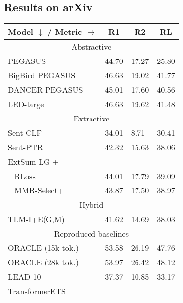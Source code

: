 \documentclass[11pt]{article}
\begin{document}
\subsection{Results on arXiv}
\label{subsec:Results on arXiv}

\begin{table}[ht]
\fontsize{9}{9}
\selectfont
\centering
\begin{tabular}[t]{@{}llll@{}}
\toprule
Model $\downarrow$ / Metric $\rightarrow$ & \multicolumn{1}{c}{R1} & \multicolumn{1}{c}{R2} & \multicolumn{1}{c}{RL} \\ \midrule
\multicolumn{4}{c}{Abstractive }               \\ \midrule
PEGASUS \citeyearpar{zhang2019pegasus}                & 44.70  & 17.27 & 25.80  \\
BigBird PEGASUS \citeyearpar{bigbird}        & \underline{46.63} & 19.02 & \underline{41.77} \\
DANCER  PEGASUS \citeyearpar{dancer2020}       & 45.01 & 17.60  & 40.56 \\
LED-large \citeyearpar{longformer}    & \underline{46.63} & \underline{19.62} & 41.48 \\ \midrule
\multicolumn{4}{c}{Extractive }                \\ \midrule
Sent-CLF \citeyearpar{pilault-etal-2020-extractive}              & 34.01 & 8.71  & 30.41 \\
Sent-PTR \citeyearpar{pilault-etal-2020-extractive}              & 42.32 & 15.63 & 38.06 \\
ExtSum-LG + \citeyearpar{xiao-carenini-2020-systematically}  &&&\\
~ RLoss & \underline{44.01} & \underline{17.79} & \underline{39.09} \\
~ MMR-Select+  & 43.87 & 17.50  & 38.97 \\ \midrule
\multicolumn{4}{c}{Hybrid }                    \\ \midrule
TLM-I+E(G,M) \citeyearpar{pilault-etal-2020-extractive}       & \underline{41.62} & \underline{14.69} & \underline{38.03} \\\midrule
\multicolumn{4}{c}{Reproduced baselines}                              \\ \midrule
ORACLE (15k tok.)   & 53.58    & 26.19   & 47.76   \\
ORACLE (28k tok.)    & 53.97    & 26.42   & 48.12   \\
LEAD-10                     & 37.37    & 10.85   & 33.17   \\
TransformerETS   & & & \\

\end{tabular}
\end{table}
\end{document}
